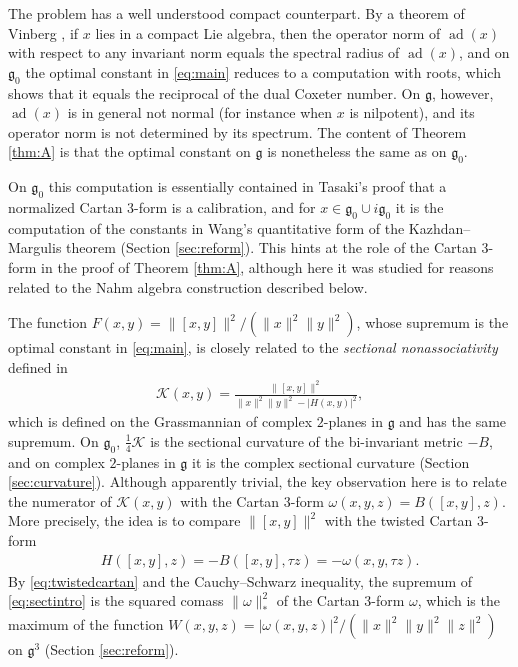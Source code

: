 \documentclass [leqno, 10pt]{amsart}
\theoremstyle{definition}
\numberwithin{equation}{section}
\newcommand{\sect}{\mathscr{K}}
\newcommand{\om}{\omega}
\newcommand{\g}{\mathfrak{g}}
\newcommand{\ad}{\operatorname{ad}}
\newcommand{\gz}{\g_{0}}
\newcommand{\norm}[1]{\lVert #1\rVert}
\newcommand{\comass}[1]{\lVert #1\rVert_{\ast}}%
\begin{document}
The problem has a well understood compact counterpart. By a theorem of Vinberg \cite{Vinberg-invariantnorms}, if $x$ lies in a compact Lie algebra, then the operator norm of $\ad(x)$ with respect to any invariant norm equals the spectral radius of $\ad(x)$, and on $\gz$ the optimal constant in \eqref{eq:main} reduces to a computation with roots, which shows that it equals the reciprocal of the dual Coxeter number. On $\g$, however, $\ad(x)$ is in general not normal (for instance when $x$ is nilpotent), and its operator norm is not determined by its spectrum. The content of Theorem \ref{thm:A} is that the optimal constant on $\g$ is nonetheless the same as on $\gz$. 

On $\gz$ this computation is essentially contained in Tasaki's proof \cite{Tasaki-calibration} that a normalized Cartan $3$-form is a calibration, and for $x \in \gz \cup i\gz$ it is the computation of the constants in Wang's quantitative form of the Kazhdan--Margulis theorem \cite{Wang-nilpotent, Adeboye-Wang-Wei} (Section \ref{sec:reform}). This hints at the role of the Cartan $3$-form in the proof of Theorem \ref{thm:A}, although here it was studied for reasons related to the Nahm algebra construction described below.

The function $F(x, y) = \norm{[x, y]}^{2}/(\norm{x}^{2}\norm{y}^{2})$, whose supremum is the optimal constant in \eqref{eq:main}, is closely related to the \emph{sectional nonassociativity} defined in \cite{Fox-sectna}
\begin{align}\label{eq:sectintro}
\sect(x, y) = \frac{\norm{[x, y]}^{2}}{\norm{x}^{2}\norm{y}^{2} - |H(x, y)|^{2}},
\end{align}
which is defined on the Grassmannian of complex $2$-planes in $\g$ and has the same supremum. On $\gz$, $\tfrac{1}{4}\sect$ is the sectional curvature of the bi-invariant metric $-B$, and on complex $2$-planes in $\g$ it is the complex sectional curvature (Section \ref{sec:curvature}). Although apparently trivial, the key observation here is to relate the numerator of $\sect(x, y)$ with the Cartan $3$-form $\om(x, y, z) = B([x, y], z)$. More precisely, the idea is to compare $\norm{[x, y]}^2$ with the twisted Cartan $3$-form 
\begin{align}\label{eq:twistedcartan}
H([x, y], z) = -B([x, y], \tau z) = -\om(x, y, \tau z).
\end{align}
By \eqref{eq:twistedcartan} and the Cauchy--Schwarz inequality, the supremum of \eqref{eq:sectintro} is the squared comass $\comass{\om}^{2}$ of the Cartan $3$-form $\om$, which is the maximum of the function $W(x, y, z) = |\om(x, y, z)|^{2}/(\norm{x}^{2}\norm{y}^{2}\norm{z}^{2})$ on $\g^{3}$ (Section \ref{sec:reform}). 
\end{document}
